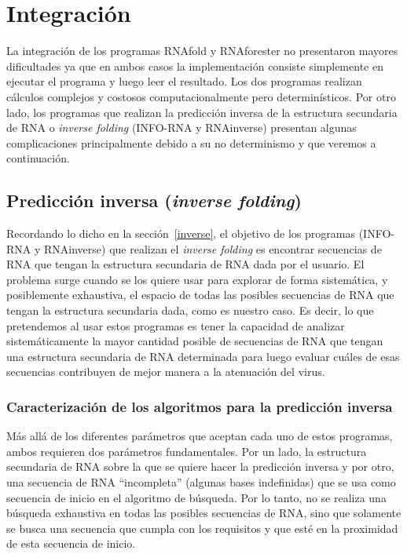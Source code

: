 \section{Integraci\'on}

La integraci\'on de los programas RNAfold y RNAforester no presentaron mayores
dificultades ya que en ambos casos la implementaci\'on consiste simplemente 
en ejecutar el programa y luego leer el resultado. Los dos programas
realizan c\'alculos complejos y costosos computacionalmente pero
determin\'isticos. Por otro lado, los programas que realizan la predicci\'on
inversa de la estructura secundaria de \ac{RNA} o \textit{inverse folding}
(INFO-RNA y RNAinverse) presentan algunas complicaciones principalmente debido a
su no determinismo y que veremos a continuaci\'on.

\subsection{Predicci\'on inversa (\textit{inverse folding})}

Recordando lo dicho en la secci\'on~\ref{inverse}, el objetivo de los programas
(INFO-RNA y RNAinverse) que realizan el \textit{inverse folding} es encontrar
secuencias de \ac{RNA} que tengan la estructura secundaria de \ac{RNA} dada por
el usuario. El problema surge cuando se los quiere usar para explorar de forma
sistem\'atica, y posiblemente exhaustiva, el espacio de todas las posibles
secuencias de \ac{RNA} que tengan la estructura secundaria dada, como es nuestro
caso. Es decir, lo que pretendemos al usar estos programas es tener la capacidad
de analizar sistem\'aticamente la mayor cantidad posible de secuencias de
\ac{RNA} que tengan una estructura secundaria de \ac{RNA} determinada para luego
evaluar cu\'ales de esas secuencias contribuyen de mejor manera a la
atenuaci\'on del virus.

\subsubsection{Caracterizaci\'on de los algoritmos para la predicci\'on inversa}

M\'as all\'a de los diferentes par\'ametros que aceptan cada uno de estos
programas, ambos requieren dos par\'ametros fundamentales. Por un lado, la
estructura secundaria de \ac{RNA} sobre la que se quiere hacer la predicci\'on
inversa y por otro, una secuencia de \ac{RNA} ``incompleta'' (algunas bases
indefinidas) que se usa como secuencia de inicio en el algoritmo de b\'usqueda.
Por lo tanto, no se realiza una b\'usqueda exhaustiva en todas las posibles
secuencias de \ac{RNA}, sino que solamente se busca una secuencia que cumpla
con los requisitos y que est\'e en la proximidad de esta secuencia de inicio.

